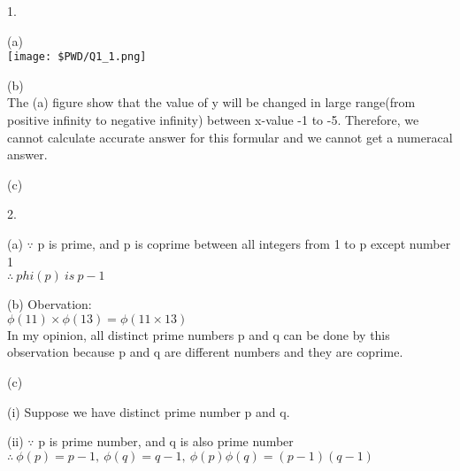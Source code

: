 \documentclass{article}
\begin{document}
  \begin{enumerate*}
    \item [1.]
    \begin{enumerate*}  
      \item [(a)] \text{}\\
      \texttt{[image: \$PWD/Q1\_1.png]}

	  \item [(b)] \text{}\\ 
      The (a) figure show that the value of y will be changed in large range(from positive infinity to negative infinity) between x-value -1 to -5. Therefore, we cannot calculate accurate answer for this formular and we cannot get a numeracal answer.
      
      \item [(c)] \text{}\\ 

    \end{enumerate*}
    
    \item [2.]
    \begin{enumerate*}
      \item [(a)]
      $\because$ p is prime, and p is coprime between all integers from 1 to p except number 1 \\
      $\therefore \ phi(p)\ is\ p-1$ 
      
      \item [(b)]
      Obervation: \\
      $\phi(11) \times \phi(13) = \phi(11 \times 13)$ \\
      In my opinion, all distinct prime numbers p and q can be done by this observation because p and q are different numbers and they are coprime.
      
      \item [(c)]
        \ 
        \begin{enumerate*}
          \item [(i)]
          Suppose we have distinct prime number p and q.
          
          \item [(ii)]
          $\because$ p is prime number, and q is also prime number \\
          $\therefore\ \phi(p) = p-1,\ \phi(q) = q-1,\ \phi(p)\phi(q)=(p-1)(q-1)$

            
           
        \end{enumerate*}
    \end{enumerate*}
  \end{enumerate*}
\end{document}
